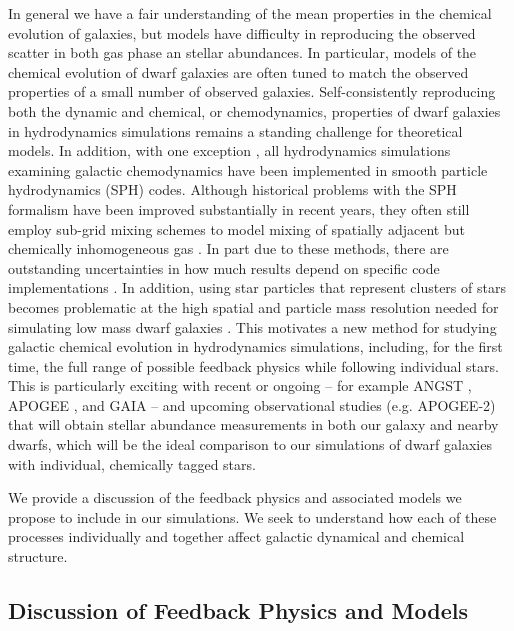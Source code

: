 \documentclass[11pt]{article}
\newcommand{\eg}{e.g.,}
\begin{document}
In general we have a fair understanding of the mean properties in the chemical evolution of galaxies, but models have difficulty in reproducing the observed scatter in both gas phase an stellar abundances. In particular, models of the chemical evolution of dwarf galaxies are often tuned to match the observed properties of a small number of observed galaxies. Self-consistently reproducing both the dynamic and chemical, or chemodynamics, properties of dwarf galaxies in hydrodynamics simulations remains a standing challenge for theoretical models. In addition, with one exception \citep{Few2012, Few2014}, all hydrodynamics simulations examining galactic chemodynamics have been implemented in smooth particle hydrodynamics (SPH) codes. Although historical problems with the SPH formalism have been improved substantially in recent years, they often still employ sub-grid mixing schemes to model mixing of spatially adjacent but chemically inhomogeneous gas \citep[\eg][]{ShenWadsleyStinson2010}. In part due to these methods, there are outstanding uncertainties in how much results depend on specific code implementations \citep{Revaz2016}. In addition, using star particles that represent clusters of stars becomes problematic at the high spatial and particle mass resolution needed for simulating low mass dwarf galaxies \citep{Revaz2016}. This motivates a new method for studying galactic chemical evolution in hydrodynamics simulations, including, for the first time, the full range of possible feedback physics while following individual stars. This is particularly exciting with recent or ongoing -- for example ANGST \citep{ANGST2009}, APOGEE \citep{APOGEE2010}, and GAIA -- and upcoming observational studies (e.g. APOGEE-2) that will obtain stellar abundance measurements in both our galaxy and nearby dwarfs, which will be the ideal comparison to our simulations of dwarf galaxies with individual, chemically tagged stars.

We provide a discussion of the feedback physics and associated models we propose to include in our simulations. We seek to understand how each of these processes individually and together affect galactic dynamical and chemical structure. 

\subsection{Discussion of Feedback Physics and Models}
\end{document}
